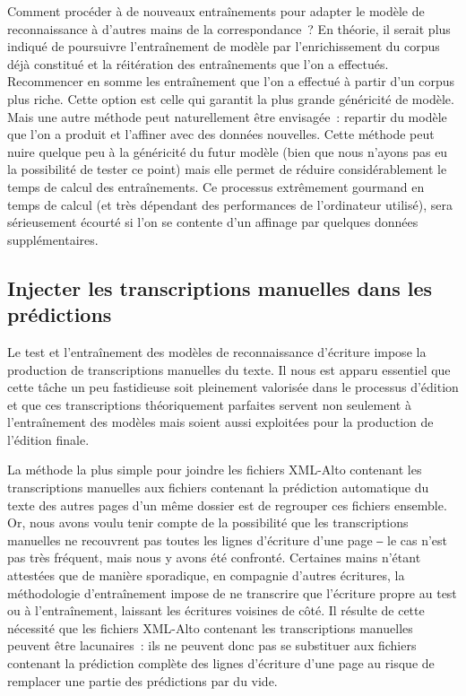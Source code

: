 \documentclass[a4paper,12pt,twoside]{book}
\begin{document}
				Comment procéder à de nouveaux entraînements pour adapter le modèle de reconnaissance à d'autres mains de la correspondance~? En théorie, il serait plus indiqué de poursuivre l'entraînement de modèle par l'enrichissement du corpus déjà constitué et la réitération des entraînements que l'on a effectués. Recommencer en somme les entraînement que l'on a effectué à partir d'un corpus plus riche. Cette option est celle qui garantit la plus grande généricité de modèle. Mais une autre méthode peut naturellement être envisagée~: repartir du modèle que l'on a produit et l'affiner avec des données nouvelles. Cette méthode peut nuire quelque peu à la généricité du futur modèle (bien que nous n'ayons pas eu la possibilité de tester ce point) mais elle permet de réduire considérablement le temps de calcul des entraînements. Ce processus extrêmement gourmand en temps de calcul (et très dépendant des performances de l'ordinateur utilisé), sera sérieusement écourté si l'on se contente d'un affinage par quelques données supplémentaires.
							
			\subsection{Injecter les transcriptions manuelles dans les prédictions}
				\label{injection}
				Le test et l'entraînement des modèles de reconnaissance d'écriture impose la production de transcriptions manuelles du texte. Il nous est apparu essentiel que cette tâche un peu fastidieuse soit pleinement valorisée dans le processus d'édition et que ces transcriptions théoriquement parfaites servent non seulement à l'entraînement des modèles mais soient aussi exploitées pour la production de l'édition finale.
				
				La méthode la plus simple pour joindre les fichiers XML-Alto contenant les transcriptions manuelles aux fichiers contenant la prédiction automatique du texte des autres pages d'un même dossier est de regrouper ces fichiers ensemble. Or, nous avons voulu tenir compte de la possibilité que les transcriptions manuelles ne recouvrent pas toutes les lignes d'écriture d'une page ‒ le cas n'est pas très fréquent, mais nous y avons été confronté. Certaines mains n'étant attestées que de manière sporadique, en compagnie d'autres écritures, la méthodologie d'entraînement impose de ne transcrire que l'écriture propre au test ou à l'entraînement, laissant les écritures voisines de côté. Il résulte de cette nécessité que les fichiers XML-Alto contenant les transcriptions manuelles peuvent être lacunaires~: ils ne peuvent donc pas se substituer aux fichiers contenant la prédiction complète des lignes d'écriture d'une page au risque de remplacer une partie des prédictions par du vide. 
				
\end{document}
